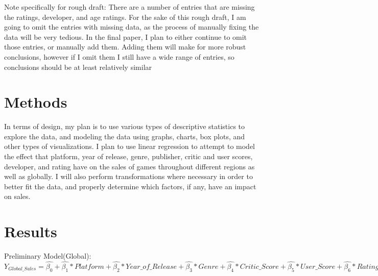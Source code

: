 \documentclass[12pt]{article}
\begin{document}
Note specifically for rough draft: There are a number of entries that are missing the ratings, developer, and age ratings.
For the sake of this rough draft, I am going to omit the entries with missing data, as the process of manually fixing the data
will be very tedious. In the final paper, I plan to either continue to omit those entries, or manually add them. Adding them
will make for more robust conclusions, however if I omit them I still have a wide range of entries, so conclusions should be at least relatively similar

\section{Methods}
\label{sec:meth}
In terms of design, my plan is to use various types of descriptive statistics to explore the data, and modeling the data using graphs, 
charts, box plots, and other types of visualizations. I plan to use linear regression to attempt to model the effect that platform, 
year of release, genre, publisher, critic and user scores, developer, and rating have on the sales of games throughout different regions 
as well as globally. I will also perform transformations where necessary in order to better fit the data, and properly determine which 
factors, if any, have an impact on sales.


\section{Results}
\label{sec:resu}
Preliminary Model(Global):
$Y_{Global\_Sales}=\hat{\beta_{0}}+\hat{\beta_{1}}*Platform+\hat{\beta_{2}}*Year\_of\_Release+\hat{\beta_{3}}*Genre+\hat{\beta_{4}}*Critic\_Score+\hat{\beta_{5}}*User\_Score+\hat{\beta_{6}}*Rating$
\end{document}
